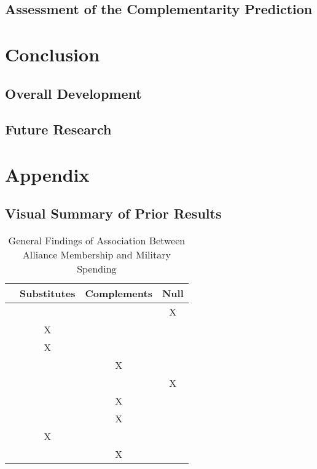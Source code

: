\documentclass[12pt]{article}
\begin{document}
\subsection{Assessment of the Complementarity Prediction} 






\section{Conclusion}



\subsection{Overall Development}








\subsection{Future Research}






\section*{Appendix}

\subsection*{Visual Summary of Prior Results} 


\begin{table}[hbt!]
\begin{tabular}{lccc}
     & Substitutes & Complements & Null \\
\hline
\citet{MostSiverson1987} &  &  & X \\
\citet{Morrow1993} & X &  &  \\ 
\citet{Conybeare1994} & X & &  \\
\citet{Diehl1994} &  & X &  \\
\citet{Goldsmith2003} &  &  & X \\
\citet{MorganPalmer2006} &  & X & \\ 
\citet{QuirozFlores2011} &  & X &  \\ 
\citet{DigiuseppePoast2016} & X & & \\ 
\citet{Horowitzetal2017} &  & X & \\ 
\hline
\end{tabular}
\caption{General Findings of Association Between Alliance Membership and Military Spending}
\end{table}









  
% 
\end{document}
